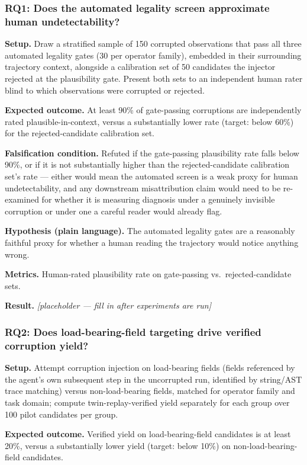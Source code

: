\documentclass[11pt]{article}
\newcommand{\ph}{\textit{[placeholder --- fill in after experiments are run]}}
\begin{document}
\subsubsection{RQ1: Does the automated legality screen approximate human undetectability?}
\textbf{Setup.} Draw a stratified sample of 150 corrupted observations that pass all three automated legality gates (30 per operator family), embedded in their surrounding trajectory context, alongside a calibration set of 50 candidates the injector rejected at the plausibility gate. Present both sets to an independent human rater blind to which observations were corrupted or rejected.

\textbf{Expected outcome.} At least 90\% of gate-passing corruptions are independently rated plausible-in-context, versus a substantially lower rate (target: below 60\%) for the rejected-candidate calibration set.

\textbf{Falsification condition.} Refuted if the gate-passing plausibility rate falls below 90\%, or if it is not substantially higher than the rejected-candidate calibration set's rate --- either would mean the automated screen is a weak proxy for human undetectability, and any downstream misattribution claim would need to be re-examined for whether it is measuring diagnosis under a genuinely invisible corruption or under one a careful reader would already flag.

\textbf{Hypothesis (plain language).} The automated legality gates are a reasonably faithful proxy for whether a human reading the trajectory would notice anything wrong.

\textbf{Metrics.} Human-rated plausibility rate on gate-passing vs.\ rejected-candidate sets.

\textbf{Result.} \ph

\subsubsection{RQ2: Does load-bearing-field targeting drive verified corruption yield?}
\textbf{Setup.} Attempt corruption injection on load-bearing fields (fields referenced by the agent's own subsequent step in the uncorrupted run, identified by string/AST trace matching) versus non-load-bearing fields, matched for operator family and task domain; compute twin-replay-verified yield separately for each group over 100 pilot candidates per group.

\textbf{Expected outcome.} Verified yield on load-bearing-field candidates is at least 20\%, versus a substantially lower yield (target: below 10\%) on non-load-bearing-field candidates.
\end{document}
